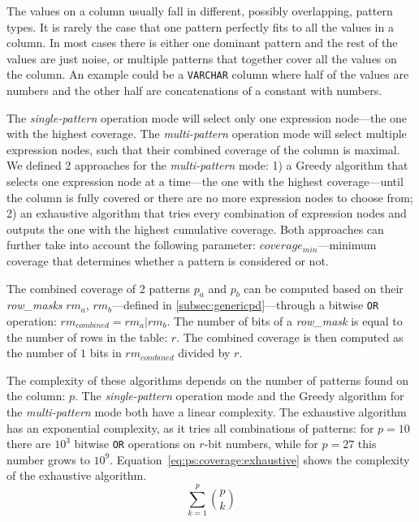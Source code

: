 The values on a column usually fall in different, possibly overlapping, pattern types. It is rarely the case that one pattern perfectly fits to all the values in a column. In most cases there is either one dominant pattern and the rest of the values are just noise, or multiple patterns that together cover all the values on the column. An example could be a \verb|VARCHAR| column where half of the values are numbers and the other half are concatenations of a constant with numbers.

The \textit{single-pattern} operation mode will select only one expression node---the one with the highest coverage. The \textit{multi-pattern} operation mode will select multiple expression nodes, such that their combined coverage of the column is maximal. We defined 2 approaches for the \textit{multi-pattern} mode: 1) a Greedy algorithm that selects one expression node at a time---the one with the highest coverage---until the column is fully covered or there are no more expression nodes to choose from; 2) an exhaustive algorithm that tries every combination of expression nodes and outputs the one with the highest cumulative coverage. Both approaches can further take into account the following parameter: \(coverage_{min}\)---minimum coverage that determines whether a pattern is considered or not.

The combined coverage of 2 patterns \(p_{a}\) and \(p_{b}\) can be computed based on their \textit{row\_masks} \(\mathit{rm}_{a}\), \(\mathit{rm}_{b}\)---defined in \ref{subsec:genericpd}---through a bitwise \verb|OR| operation: \(\mathit{rm}_{combined} = \mathit{rm}_{a} | \mathit{rm}_{b}\). The number of bits of a \textit{row\_mask} is equal to the number of rows in the table: \(r\). The combined coverage is then computed as the number of \(1\) bits in \(\mathit{rm}_{combined}\) divided by \(r\).

The complexity of these algorithms depends on the number of patterns found on the column: \(p\). The \textit{single-pattern} operation mode and the Greedy algorithm for the \textit{multi-pattern} mode both have a linear complexity. The exhaustive algorithm has an exponential complexity, as it tries all combinations of patterns: for \(p = 10\) there are \(10^3\) bitwise \verb|OR| operations on \(r\)-bit numbers, while for \(p = 27\) this number grows to \(10^9\). Equation~\ref{eq:ps:coverage:exhaustive} shows the complexity of the exhaustive algorithm.
\begin{equation}
\label{eq:ps:coverage:exhaustive}
    \sum_{k=1}^{p} {p \choose k}
\end{equation}


